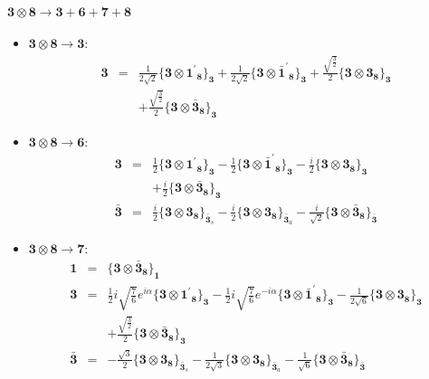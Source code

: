 \documentclass[english]{article}
\newcommand{\subcg}[3]{\big\{ {#1}\otimes{#2}\big\}^{}_{#3}}
\newcommand{\rep}[1]{\mathbf{#1}}
\begin{document}
\paragraph*{\Large $\rep{3}\otimes\rep{8}\to\rep{3}+\rep{6}+\rep{7}+\rep{8}$}
\begin{itemize}
\item $\rep{3}\otimes\rep{8}\to\rep{3}$:
\begin{eqnarray*}
\rep{3} &=& \frac{1}{2 \sqrt{2}}\subcg{\rep{3}}{\rep{1^{\prime}}_{\rep{8}}}{\rep{3}}+\frac{1}{2 \sqrt{2}}\subcg{\rep{3}}{\rep{\bar{1}^{\prime}}_{\rep{8}}}{\rep{3}}+\frac{\sqrt{\frac{3}{2}}}{2}\subcg{\rep{3}}{\rep{3}_{\rep{8}}}{\rep{3}} \\ 
 & & +\frac{\sqrt{\frac{3}{2}}}{2}\subcg{\rep{3}}{\rep{\bar{3}}_{\rep{8}}}{\rep{3}}
\end{eqnarray*}
\item $\rep{3}\otimes\rep{8}\to\rep{6}$:
\begin{eqnarray*}
\rep{3} &=& \frac{1}{2}\subcg{\rep{3}}{\rep{1^{\prime}}_{\rep{8}}}{\rep{3}}-\frac{1}{2}\subcg{\rep{3}}{\rep{\bar{1}^{\prime}}_{\rep{8}}}{\rep{3}}-\frac{i}{2}\subcg{\rep{3}}{\rep{3}_{\rep{8}}}{\rep{3}} \\ 
 & & +\frac{i}{2}\subcg{\rep{3}}{\rep{\bar{3}}_{\rep{8}}}{\rep{3}}
\\
\rep{\bar{3}} &=& \frac{i}{2}\subcg{\rep{3}}{\rep{3}_{\rep{8}}}{\rep{\bar{3}}_{s}}-\frac{i}{2}\subcg{\rep{3}}{\rep{3}_{\rep{8}}}{\rep{\bar{3}}_{a}}-\frac{i}{\sqrt{2}}\subcg{\rep{3}}{\rep{\bar{3}}_{\rep{8}}}{\rep{\bar{3}}}
\end{eqnarray*}
\item $\rep{3}\otimes\rep{8}\to\rep{7}$:
\begin{eqnarray*}
\rep{1} &=& \subcg{\rep{3}}{\rep{\bar{3}}_{\rep{8}}}{\rep{1}}
\\
\rep{3} &=& \frac{1}{2} i \sqrt{\frac{7}{6}} e^{i \alpha }\subcg{\rep{3}}{\rep{1^{\prime}}_{\rep{8}}}{\rep{3}}-\frac{1}{2} i \sqrt{\frac{7}{6}} e^{-i \alpha }\subcg{\rep{3}}{\rep{\bar{1}^{\prime}}_{\rep{8}}}{\rep{3}}-\frac{1}{2 \sqrt{6}}\subcg{\rep{3}}{\rep{3}_{\rep{8}}}{\rep{3}} \\ 
 & & +\frac{\sqrt{\frac{3}{2}}}{2}\subcg{\rep{3}}{\rep{\bar{3}}_{\rep{8}}}{\rep{3}}
\\
\rep{\bar{3}} &=& -\frac{\sqrt{3}}{2}\subcg{\rep{3}}{\rep{3}_{\rep{8}}}{\rep{\bar{3}}_{s}}-\frac{1}{2 \sqrt{3}}\subcg{\rep{3}}{\rep{3}_{\rep{8}}}{\rep{\bar{3}}_{a}}-\frac{1}{\sqrt{6}}\subcg{\rep{3}}{\rep{\bar{3}}_{\rep{8}}}{\rep{\bar{3}}}
\end{eqnarray*}

\end{itemize}
\end{document}
